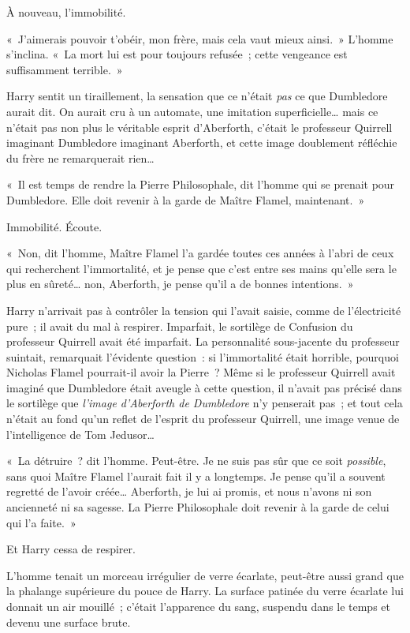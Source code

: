À nouveau, l'immobilité.

«~J'aimerais pouvoir t'obéir, mon frère, mais cela vaut mieux ainsi.~» L'homme s'inclina. «~La mort lui est pour toujours refusée~; cette vengeance est suffisamment terrible.~»

Harry sentit un tiraillement, la sensation que ce n'était \emph{pas} ce que Dumbledore aurait dit. On aurait cru à un automate, une imitation superficielle… mais ce n'était pas non plus le véritable esprit d'Aberforth, c'était le professeur Quirrell imaginant Dumbledore imaginant Aberforth, et cette image doublement réfléchie du frère ne remarquerait rien…

«~Il est temps de rendre la Pierre Philosophale, dit l'homme qui se prenait pour Dumbledore. Elle doit revenir à la garde de Maître Flamel, maintenant.~»

Immobilité. Écoute.

«~Non, dit l'homme, Maître Flamel l'a gardée toutes ces années à l'abri de ceux qui recherchent l'immortalité, et je pense que c'est entre ses mains qu'elle sera le plus en sûreté… non, Aberforth, je pense qu'il a de bonnes intentions.~»

Harry n'arrivait pas à contrôler la tension qui l'avait saisie, comme de l'électricité pure~; il avait du mal à respirer. Imparfait, le sortilège de Confusion du professeur Quirrell avait été imparfait. La personnalité sous-jacente du professeur suintait, remarquait l'évidente question~: si l'immortalité était horrible, pourquoi Nicholas Flamel pourrait-il avoir la Pierre~? Même si le professeur Quirrell avait imaginé que Dumbledore était aveugle à cette question, il n'avait pas précisé dans le sortilège que \emph{l'image d'Aberforth de Dumbledore} n'y penserait pas~; et tout cela n'était au fond qu'un reflet de l'esprit du professeur Quirrell, une image venue de l'intelligence de Tom Jedusor…

«~La détruire~? dit l'homme. Peut-être. Je ne suis pas sûr que ce soit \emph{possible}, sans quoi Maître Flamel l'aurait fait il y a longtemps. Je pense qu'il a souvent regretté de l'avoir créée… Aberforth, je lui ai promis, et nous n'avons ni son ancienneté ni sa sagesse. La Pierre Philosophale doit revenir à la garde de celui qui l'a faite.~»

Et Harry cessa de respirer.

L'homme tenait un morceau irrégulier de verre écarlate, peut-être aussi grand que la phalange supérieure du pouce de Harry. La surface patinée du verre écarlate lui donnait un air mouillé~; c'était l'apparence du sang, suspendu dans le temps et devenu une surface brute.

